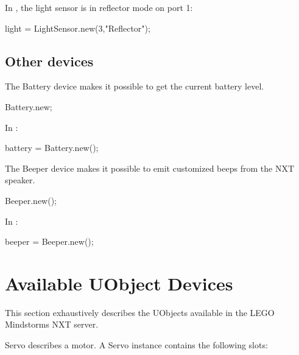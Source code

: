 In , the light sensor is in reflector mode on port 1:
\begin{urbiunchecked}
light = LightSensor.new(3,"Reflector");
\end{urbiunchecked}


\subsection{Other devices}
The Battery device makes it possible to get the current battery level.
\begin{urbiunchecked}
Battery.new;
\end{urbiunchecked}

In :
\begin{urbiunchecked}
battery = Battery.new();
\end{urbiunchecked}

The Beeper device makes it possible to emit customized beeps from the NXT
speaker.
\begin{urbiunchecked}
Beeper.new();
\end{urbiunchecked}

In :
\begin{urbiunchecked}
beeper = Beeper.new();
\end{urbiunchecked}


\section{Available UObject Devices}
\label{sec:nxt:specs}
This section exhaustively describes the UObjects available in the LEGO
Mindstorms NXT \urbi server.

\let\subsectionOrig\subsection
\let\subsection\subsectionObject

\subsection{Servo}
Servo describes a motor. A Servo instance contains the following slots:

